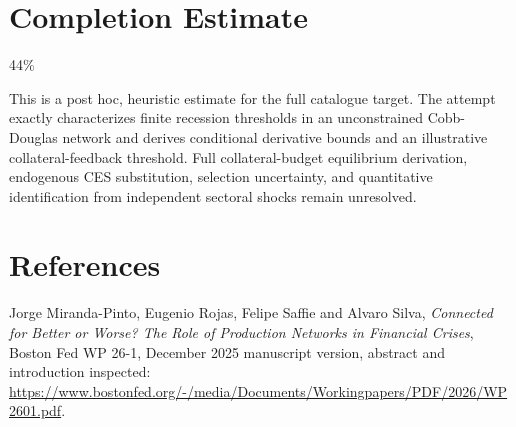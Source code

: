 \documentclass[11pt]{article}
\begin{document}
\section{Completion Estimate}
44\%

This is a post hoc, heuristic estimate for the full catalogue target.
The attempt exactly characterizes finite recession thresholds in an unconstrained Cobb-Douglas network and derives conditional derivative bounds and an illustrative collateral-feedback threshold. Full collateral-budget equilibrium derivation, endogenous CES substitution, selection uncertainty, and quantitative identification from independent sectoral shocks remain unresolved.

\section*{References}
Jorge Miranda-Pinto, Eugenio Rojas, Felipe Saffie and Alvaro Silva, \emph{Connected for Better or Worse? The Role of Production Networks in Financial Crises}, Boston Fed WP 26-1, December 2025 manuscript version, abstract and introduction inspected:
\url{https://www.bostonfed.org/-/media/Documents/Workingpapers/PDF/2026/WP2601.pdf}.
\end{document}
